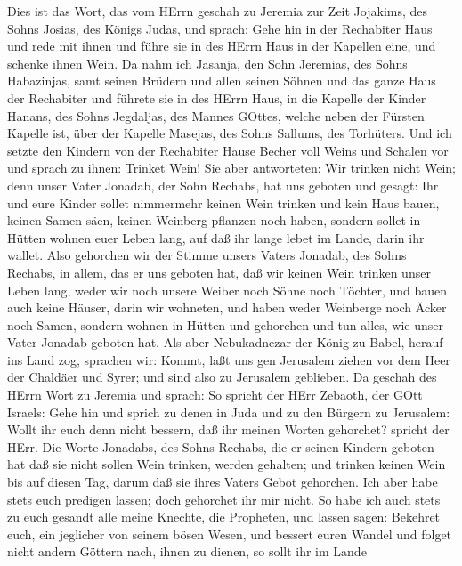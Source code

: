  Dies ist das Wort, das vom HErrn geschah zu Jeremia zur
Zeit Jojakims, des Sohns Josias, des Königs Judas, und sprach:
 Gehe hin in der Rechabiter Haus und rede mit ihnen und
führe sie in des HErrn Haus in der Kapellen eine, und schenke ihnen
Wein.  Da nahm ich Jasanja, den Sohn Jeremias, des Sohns
Habazinjas, samt seinen Brüdern und allen seinen Söhnen und das ganze
Haus der Rechabiter  und führete sie in des HErrn Haus, in
die Kapelle der Kinder Hanans, des Sohns Jegdaljas, des Mannes GOttes,
welche neben der Fürsten Kapelle ist, über der Kapelle Masejas, des
Sohns Sallums, des Torhüters.  Und ich setzte den Kindern
von der Rechabiter Hause Becher voll Weins und Schalen vor und sprach zu
ihnen: Trinket Wein!  Sie aber antworteten: Wir trinken
nicht Wein; denn unser Vater Jonadab, der Sohn Rechabs, hat uns geboten
und gesagt: Ihr und eure Kinder sollet nimmermehr keinen Wein trinken
 und kein Haus bauen, keinen Samen säen, keinen Weinberg
pflanzen noch haben, sondern sollet in Hütten wohnen euer Leben lang,
auf daß ihr lange lebet im Lande, darin ihr wallet.  Also
gehorchen wir der Stimme unsers Vaters Jonadab, des Sohns Rechabs, in
allem, das er uns geboten hat, daß wir keinen Wein trinken unser Leben
lang, weder wir noch unsere Weiber noch Söhne noch Töchter, 
und bauen auch keine Häuser, darin wir wohneten, und haben weder
Weinberge noch Äcker noch Samen,  sondern wohnen in Hütten
und gehorchen und tun alles, wie unser Vater Jonadab geboten hat.
 Als aber Nebukadnezar der König zu Babel, herauf ins Land
zog, sprachen wir: Kommt, laßt uns gen Jerusalem ziehen vor dem Heer der
Chaldäer und Syrer; und sind also zu Jerusalem geblieben. 
Da geschah des HErrn Wort zu Jeremia und sprach:  So
spricht der HErr Zebaoth, der GOtt Israels: Gehe hin und sprich zu denen
in Juda und zu den Bürgern zu Jerusalem: Wollt ihr euch denn nicht
bessern, daß ihr meinen Worten gehorchet? spricht der HErr.
 Die Worte Jonadabs, des Sohns Rechabs, die er seinen
Kindern geboten hat daß sie nicht sollen Wein trinken, werden gehalten;
und trinken keinen Wein bis auf diesen Tag, darum daß sie ihres Vaters
Gebot gehorchen. Ich aber habe stets euch predigen lassen; doch
gehorchet ihr mir nicht.  So habe ich auch stets zu euch
gesandt alle meine Knechte, die Propheten, und lassen sagen: Bekehret
euch, ein jeglicher von seinem bösen Wesen, und bessert euren Wandel und
folget nicht andern Göttern nach, ihnen zu dienen, so sollt ihr im Lande
